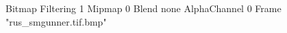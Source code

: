 {Bitmap
	{Filtering 1}
	{Mipmap 0}
	{Blend none}
	{AlphaChannel 0}
	{Frame "rus_smgunner.tif.bmp"}
}
